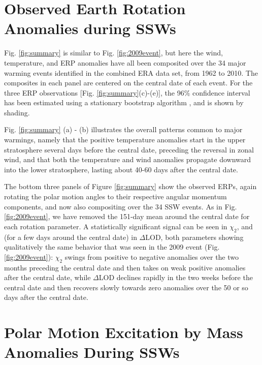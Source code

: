 \documentclass[draft,jgrga]{agutex}
\begin{document}
\begin{article}
\section{Observed Earth Rotation Anomalies during SSWs}
\label{sec:obs}

Fig. \ref{fig:summary} is similar to Fig. \ref{fig:2009event}, but here the wind, temperature, and ERP anomalies have all been composited over the 34 major warming events identified in the combined ERA data set, from 1962 to 2010.
The composites in each panel are centered on the central date of each event.
For the three ERP observations [Fig. \ref{fig:summary}(c)-(e)], the 96$\%$ confidence interval has been estimated  using a stationary bootstrap algorithm \citep{wilks1995}, and is shown by shading.

Fig. \ref{fig:summary} (a) - (b)  { illustrates the overall patterns common to major warmings, namely that the positive temperature anomalies  start in the upper stratosphere several days before the central date, preceding the reversal in zonal wind, and that both the temperature and  wind anomalies propagate downward into the lower
stratosphere, lasting about 40-60 days after the central date.}


The bottom  {three panels} of Figure \ref{fig:summary} show the observed ERPs,  {again rotating the polar motion angles to their respective angular momentum components, and now also compositing  over the 34 SSW events.}
 {As in Fig.} \ref{fig:2009event},  {we have removed the 151-day mean around the central date for each rotation parameter.}
A statistically significant signal can be seen in $\chi_2$, and  {(for a few days around the central date)} in $\Delta$LOD, both parameters showing qualitatively the same behavior that was seen in the 2009 event (Fig. \ref{fig:2009event}): $\chi_2$ swings from positive to negative anomalies over the two months preceding the central date and then takes on weak positive anomalies after the central date, while $\Delta$LOD declines rapidly in the two weeks before the central date and then recovers slowly towards zero anomalies over the 50 or so days after the central date.



\section{Polar Motion Excitation by Mass Anomalies During SSWs}
\label{sec:X12}


\end{article}
\end{document}
